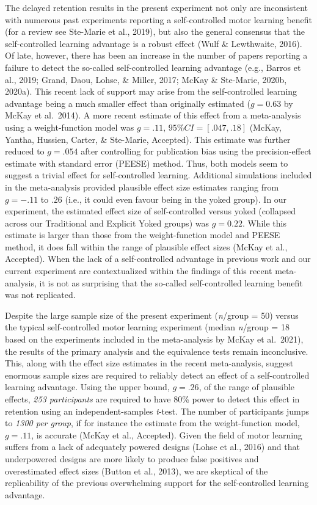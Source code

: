 \documentclass[
  english,
  doc, donotrepeattitle,floatsintext]{apa7}
\begin{document}
The delayed retention results in the present experiment not only are inconsistent with numerous past experiments reporting a self-controlled motor learning benefit (for a review see Ste-Marie et al., 2019), but also the general consensus that the self-controlled learning advantage is a robust effect (Wulf \& Lewthwaite, 2016). Of late, however, there has been an increase in the number of papers reporting a failure to detect the so-called self-controlled learning advantage (e.g., Barros et al., 2019; Grand, Daou, Lohse, \& Miller, 2017; McKay \& Ste-Marie, 2020b, 2020a). This recent lack of support may arise from the self-controlled learning advantage being a much smaller effect than originally estimated (\(g = 0.63\) by McKay et al.~2014). A more recent estimate of this effect from a meta-analysis using a weight-function model was \(g = .11, \,95\% CI = [.047, .18]\) (McKay, Yantha, Hussien, Carter, \& Ste-Marie, Accepted). This estimate was further reduced to \(g = .054\) after controlling for publication bias using the precision-effect estimate with standard error (PEESE) method. Thus, both models seem to suggest a trivial effect for self-controlled learning. Additional simulations included in the meta-analysis provided plausible effect size estimates ranging from \(g = -.11\) to \(.26\) (i.e., it could even favour being in the yoked group). In our experiment, the estimated effect size of self-controlled versus yoked (collapsed across our Traditional and Explicit Yoked groups) was \(g = 0.22\). While this estimate is larger than those from the weight-function model and PEESE method, it does fall within the range of plausible effect sizes (McKay et al., Accepted). When the lack of a self-controlled advantage in previous work and our current experiment are contextualized within the findings of this recent meta-analysis, it is not as surprising that the so-called self-controlled learning benefit was not replicated.

Despite the large sample size of the present experiment (\emph{n}/group = 50) versus the typical self-controlled motor learning experiment (median \emph{n}/group = 18 based on the experiments included in the meta-analysis by McKay et al.~2021), the results of the primary analysis and the equivalence tests remain inconclusive. This, along with the effect size estimates in the recent meta-analysis, suggest enormous sample sizes are required to reliably detect an effect of a self-controlled learning advantage. Using the upper bound, \(g = .26\), of the range of plausible effects, \emph{253 participants} are required to have 80\% power to detect this effect in retention using an independent-samples \emph{t}-test. The number of participants jumps to \emph{1300 per group}, if for instance the estimate from the weight-function model, \(g = .11\), is accurate (McKay et al., Accepted). Given the field of motor learning suffers from a lack of adequately powered designs (Lohse et al., 2016) and that underpowered designs are more likely to produce false positives and overestimated effect sizes (Button et al., 2013), we are skeptical of the replicability of the previous overwhelming support for the self-controlled learning advantage.
\end{document}
